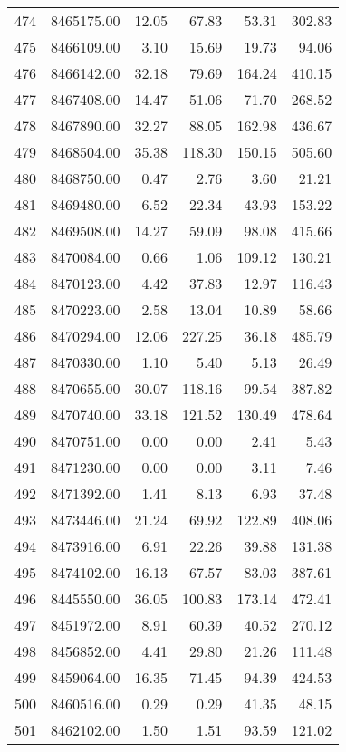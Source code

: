 \begin{table}[ht]
\begin{tabular}{rrrrrr}
  474 & 8465175.00 & 12.05 & 67.83 & 53.31 & 302.83 \\ 
  475 & 8466109.00 & 3.10 & 15.69 & 19.73 & 94.06 \\ 
  476 & 8466142.00 & 32.18 & 79.69 & 164.24 & 410.15 \\ 
  477 & 8467408.00 & 14.47 & 51.06 & 71.70 & 268.52 \\ 
  478 & 8467890.00 & 32.27 & 88.05 & 162.98 & 436.67 \\ 
  479 & 8468504.00 & 35.38 & 118.30 & 150.15 & 505.60 \\ 
  480 & 8468750.00 & 0.47 & 2.76 & 3.60 & 21.21 \\ 
  481 & 8469480.00 & 6.52 & 22.34 & 43.93 & 153.22 \\ 
  482 & 8469508.00 & 14.27 & 59.09 & 98.08 & 415.66 \\ 
  483 & 8470084.00 & 0.66 & 1.06 & 109.12 & 130.21 \\ 
  484 & 8470123.00 & 4.42 & 37.83 & 12.97 & 116.43 \\ 
  485 & 8470223.00 & 2.58 & 13.04 & 10.89 & 58.66 \\ 
  486 & 8470294.00 & 12.06 & 227.25 & 36.18 & 485.79 \\ 
  487 & 8470330.00 & 1.10 & 5.40 & 5.13 & 26.49 \\ 
  488 & 8470655.00 & 30.07 & 118.16 & 99.54 & 387.82 \\ 
  489 & 8470740.00 & 33.18 & 121.52 & 130.49 & 478.64 \\ 
  490 & 8470751.00 & 0.00 & 0.00 & 2.41 & 5.43 \\ 
  491 & 8471230.00 & 0.00 & 0.00 & 3.11 & 7.46 \\ 
  492 & 8471392.00 & 1.41 & 8.13 & 6.93 & 37.48 \\ 
  493 & 8473446.00 & 21.24 & 69.92 & 122.89 & 408.06 \\ 
  494 & 8473916.00 & 6.91 & 22.26 & 39.88 & 131.38 \\ 
  495 & 8474102.00 & 16.13 & 67.57 & 83.03 & 387.61 \\ 
  496 & 8445550.00 & 36.05 & 100.83 & 173.14 & 472.41 \\ 
  497 & 8451972.00 & 8.91 & 60.39 & 40.52 & 270.12 \\ 
  498 & 8456852.00 & 4.41 & 29.80 & 21.26 & 111.48 \\ 
  499 & 8459064.00 & 16.35 & 71.45 & 94.39 & 424.53 \\ 
  500 & 8460516.00 & 0.29 & 0.29 & 41.35 & 48.15 \\ 
  501 & 8462102.00 & 1.50 & 1.51 & 93.59 & 121.02 \\ 

\end{tabular}
\end{table}
